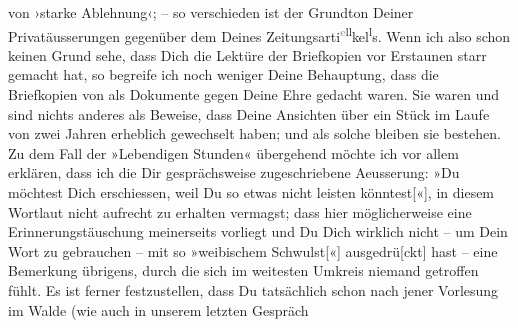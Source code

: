 \begin{ledgroupsized}[t]{13cm}
{{{                  von ›starke Ablehnung‹}}}\label{K_L03521-19h}; – so verschieden ist der Grundton Deiner
               Privatäusserungen gegenüber dem Deines Zeitungsarti\substVorne{}\textsuperscript{\textcolor{gray}{e}ll}\substDazwischen{}kel\substHinten{}\substVorne{}\textsuperscript{l}\substDazwischen{}s\substHinten{}. Wenn ich also schon keinen Grund sehe, dass Dich die Lektüre der
               Briefkopien vor Erstaunen starr gemacht hat, so begreife ich noch weniger Deine
               Behauptung, dass die Briefkopien von \label{T_L03521-1v}\label{T_L03521-1h} als Dokumente gegen Deine Ehre gedacht waren. Sie
               waren und sind nichts anderes als Beweise, dass Deine Ansichten über ein Stück im Laufe von zwei Jahren
               erheblich gewechselt haben\introOben{};\introOben{} und als solche bleiben sie
               bestehen.\pend
           \pstart
           Zu dem Fall der »Lebendigen Stunden« übergehend
               möchte ich vor allem erklären, dass ich die Dir ge{\pb}sprächsweise zugeschriebene
               Aeusserung: »Du möchtest Dich erschiessen, weil Du so etwas nicht leisten
                  könntest{[}«{]}, in diesem Wortlaut nicht aufrecht zu erhalten
               vermagst; dass hier möglicherweise eine Erinnerungstäuschung meinerseits vorliegt und
               Du Dich wirklich nicht – um Dein Wort zu gebrauchen – mit so »weibischem
                  Schwulst{[}«{]} ausgedrü{[}ckt{]} hast – eine
               Bemerkung übrigens, durch die sich im weitesten Umkreis niemand getroffen fühlt. Es
               ist ferner festzustellen, dass Du tatsächlich schon nach jener Vorlesung im Walde (wie auch in unserem letzten Gespräch

\end{ledgroupsized}
